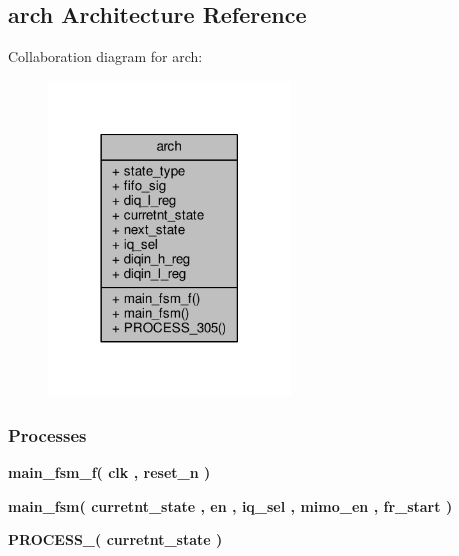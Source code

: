 \subsection{arch Architecture Reference}
\label{classwr__rx__fifo__v2_1_1arch}


Collaboration diagram for arch\+:\nopagebreak
\begin{figure}[H]
\begin{center}
\leavevmode
\includegraphics[width=182pt]{dc/dc7/classwr__rx__fifo__v2_1_1arch__coll__graph}
\end{center}
\end{figure}
\subsubsection*{Processes}
 \begin{DoxyCompactItemize}
\item 
{\bf main\+\_\+fsm\+\_\+f}{\bfseries  ( {\bfseries {\bfseries {\bf clk}} \textcolor{vhdlchar}{ }} , {\bfseries {\bfseries {\bf reset\+\_\+n}} \textcolor{vhdlchar}{ }} )}
\item 
{\bf main\+\_\+fsm}{\bfseries  ( {\bfseries {\bfseries {\bf curretnt\+\_\+state}} \textcolor{vhdlchar}{ }} , {\bfseries {\bfseries {\bf en}} \textcolor{vhdlchar}{ }} , {\bfseries {\bfseries {\bf iq\+\_\+sel}} \textcolor{vhdlchar}{ }} , {\bfseries {\bfseries {\bf mimo\+\_\+en}} \textcolor{vhdlchar}{ }} , {\bfseries {\bfseries {\bf fr\+\_\+start}} \textcolor{vhdlchar}{ }} )}
\item 
{\bf P\+R\+O\+C\+E\+S\+S\+\_}{\bfseries  ( {\bfseries {\bfseries {\bf curretnt\+\_\+state}} \textcolor{vhdlchar}{ }} )}
\end{DoxyCompactItemize}
